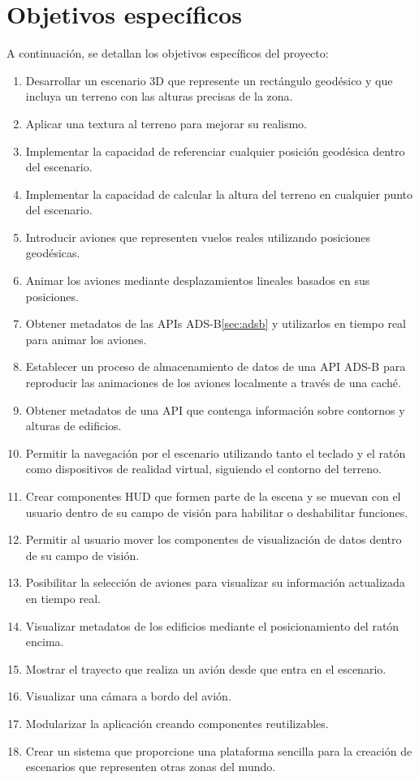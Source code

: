 \documentclass[a4paper, 11pt]{book}
\begin{document}
\section{Objetivos específicos} %
\label{sec:objetivosEspecificos} %
A continuación, se detallan los objetivos específicos del proyecto:
\begin{enumerate}
    \item Desarrollar un escenario 3D que represente un rectángulo geodésico y que incluya un terreno con las alturas precisas de la zona.
    \item Aplicar una textura al terreno para mejorar su realismo.
    \item Implementar la capacidad de referenciar cualquier posición geodésica dentro del escenario.
    \item Implementar la capacidad de calcular la altura del terreno en cualquier punto del escenario.
    \item Introducir aviones que representen vuelos reales utilizando posiciones geodésicas.
    \item Animar los aviones mediante desplazamientos lineales basados en sus posiciones.
    \item Obtener metadatos de las APIs ADS-B\ref{sec:adsb} y utilizarlos en tiempo real para animar los aviones.
    \item Establecer un proceso de almacenamiento de datos de una API ADS-B para reproducir las animaciones de los aviones localmente a través de una caché.
    \item Obtener metadatos de una API que contenga información sobre contornos y alturas de edificios.
    \item Permitir la navegación por el escenario utilizando tanto el teclado y el ratón como dispositivos de realidad virtual, siguiendo el contorno del terreno.
    \item Crear componentes HUD que formen parte de la escena y se muevan con el usuario dentro de su campo de visión para habilitar o deshabilitar funciones.
    \item Permitir al usuario mover los componentes de visualización de datos dentro de su campo de visión.
    \item Posibilitar la selección de aviones para visualizar su información actualizada en tiempo real.
    \item Visualizar metadatos de los edificios mediante el posicionamiento del ratón encima.
    \item Mostrar el trayecto que realiza un avión desde que entra en el escenario.
    \item Visualizar una cámara a bordo del avión.
    \item Modularizar la aplicación creando componentes reutilizables.
    \item Crear un sistema que proporcione una plataforma sencilla para la creación de escenarios que representen otras zonas del mundo.
\end{enumerate}
\end{document}
